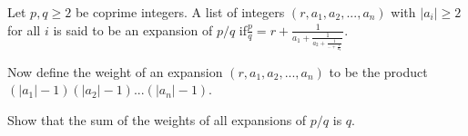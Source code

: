 Let $p,q\geq 2$ be coprime integers. A list of integers $(r,a_{1},a_{2},...,a_{n})$ with $|a_{i}|\geq 2$ for all $i$ is said to be an expansion of $p/q$ if$\frac{p}{q}=r+\frac{1}{a_{1}+\frac{1}{a_{2}+\frac{1}{...+\frac{1}{a_{n}}}}}$.

Now define the weight of an expansion $(r,a_{1},a_{2},...,a_{n})$ to be the product$(|a_{1}|-1)(|a_{2}|-1)...(|a_{n}|-1)$.

Show that the sum of the weights of all expansions of $p/q$ is $q$.